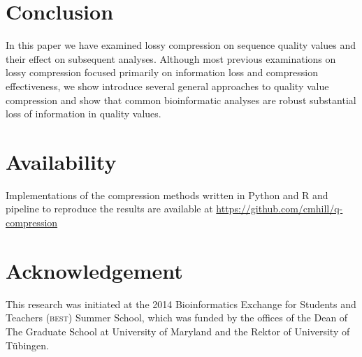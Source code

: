 \documentclass{bioinfo}
\begin{document}
%
%

\section{Conclusion}

In this paper we have examined lossy compression on sequence quality
values and their effect on subsequent analyses. Although most previous
examinations on lossy compression focused primarily on information
loss and compression effectiveness, we show introduce several general
approaches to quality value compression and show that common
bioinformatic analyses are robust substantial loss of information in
quality values.

\section{Availability}
Implementations of the compression methods written in Python and R and
pipeline to reproduce the results are available at
\url{https://github.com/cmhill/q-compression}

\section*{Acknowledgement}
This research was initiated at the 2014 Bioinformatics Exchange for
Students and Teachers (\textsc{best}) Summer School, which was funded
by the offices of the Dean of The Graduate School at University of
Maryland and the Rektor of University of T\"{u}bingen.






%

%


\end{document}
